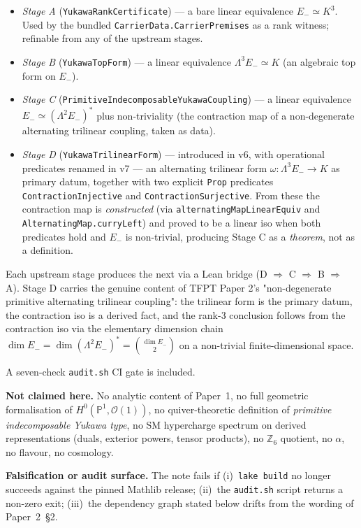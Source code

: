 \begin{tfptfrontbox}
\begin{itemize}[leftmargin=1.5em, itemsep=1pt]
\item \emph{Stage A} (\texttt{YukawaRankCertificate}) --- a
    bare linear equivalence $E_- \simeq K^3$. Used by the
    bundled \texttt{CarrierData.CarrierPremises} as a rank
    witness; refinable from any of the upstream stages.
\item \emph{Stage B} (\texttt{YukawaTopForm}) --- a linear
    equivalence $\Lambda^3 E_- \simeq K$ (an algebraic top
    form on $E_-$).
\item \emph{Stage C} (\texttt{PrimitiveIndecomposableYukawaCoupling})
    --- a linear equivalence $E_- \simeq (\Lambda^2 E_-)^*$
    plus non-triviality (the contraction map of a non-degenerate
    alternating trilinear coupling, taken as data).
\item \emph{Stage D} (\texttt{YukawaTrilinearForm}) --- introduced
    in v6, with operational predicates renamed in v7 --- an
    alternating trilinear form $\omega : \Lambda^3 E_- \to K$ as
    primary datum, together with two explicit \texttt{Prop}
    predicates \texttt{ContractionInjective} and
    \texttt{ContractionSurjective}. From these the contraction
    map is \emph{constructed} (via
    \texttt{alternatingMapLinearEquiv} and
    \texttt{AlternatingMap.curryLeft}) and proved to be a linear
    iso when both predicates hold and $E_-$ is non-trivial,
    producing Stage C as a \emph{theorem}, not as a definition.
\end{itemize}

Each upstream stage produces the next via a Lean bridge
(D $\Rightarrow$ C $\Rightarrow$ B $\Rightarrow$ A). Stage D
carries the genuine content of TFPT Paper 2's
"non-degenerate primitive alternating trilinear coupling": the
trilinear form is the primary datum, the contraction iso is a
derived fact, and the rank-3 conclusion follows from the
contraction iso via the elementary dimension chain
$\dim E_- = \dim (\Lambda^2 E_-)^* = \binom{\dim E_-}{2}$ on a
non-trivial finite-dimensional space.

A seven-check \texttt{audit.sh} CI gate is included.

\textbf{Not claimed here.} No analytic content of Paper~1, no full
geometric formalisation of $H^0(\mathbb P^1, \mathcal O(1))$, no
quiver-theoretic definition of \emph{primitive indecomposable
Yukawa type}, no SM hypercharge spectrum on derived
representations (duals, exterior powers, tensor products), no
$\mathbb Z_6$ quotient, no $\alpha$, no flavour, no cosmology.

\textbf{Falsification or audit surface.} The note fails if
(i)~\texttt{lake build} no longer succeeds against the pinned
Mathlib release; (ii)~the \texttt{audit.sh} script returns a
non-zero exit; (iii)~the dependency graph stated below drifts from
the wording of Paper~2~\S2.
\end{tfptfrontbox}

